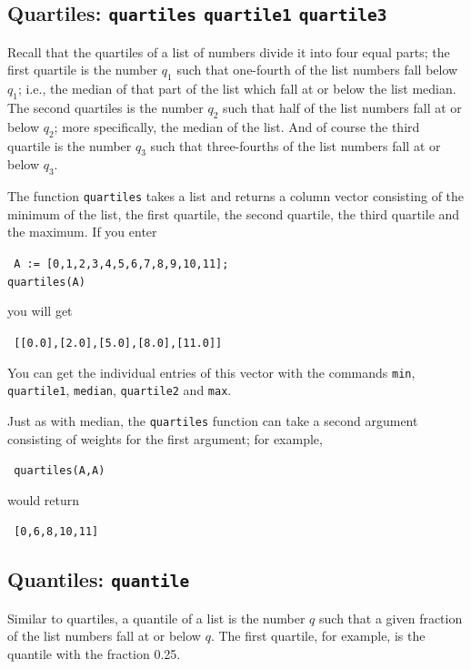 \documentclass[a4paper,11pt]{book}
\begin{document}
\subsection{Quartiles: \texttt{quartiles} \texttt{quartile1} \texttt{quartile3}}

Recall that the quartiles of a list of numbers divide it into four
equal parts; the first quartile is the number $q_1$ such that
one-fourth of the list numbers fall below $q_1$; i.e., the median of
that part of the list which fall at or below the list median.  The
second quartiles is the number $q_2$ such that half of the list
numbers fall at or below $q_2$; more specifically, the median of the
list.  And of course the third quartile is the number $q_3$ such that
three-fourths of the list numbers fall at or below $q_3$.

The function \texttt{quartiles} takes a list and returns a column
vector consisting of the minimum of the list, the first quartile, the second
quartile, the third quartile and the maximum.   If you enter
\begin{center}
  \tt
  A := [0,1,2,3,4,5,6,7,8,9,10,11];\\
  quartiles(A)
\end{center}
you will get
\begin{center}
  \tt
  [[0.0],[2.0],[5.0],[8.0],[11.0]]
\end{center}

You can get the individual entries of this vector with the commands
\texttt{min}, \texttt{quartile1}, \texttt{median}, \texttt{quartile2}
and \texttt{max}.

Just as with median, the \texttt{quartiles} function can take a second
argument consisting of weights for the first argument; for example,
\begin{center}
  \tt
  quartiles(A,A)
\end{center}
would return
\begin{center}
  \tt
  [0,6,8,10,11]
\end{center}

\subsection{Quantiles: \texttt{quantile}}

Similar to quartiles, a quantile of a list is the number $q$ such that
a given fraction of the list numbers fall at or below $q$.  The first
quartile, for example, is the quantile with the fraction 0.25.
\end{document}
